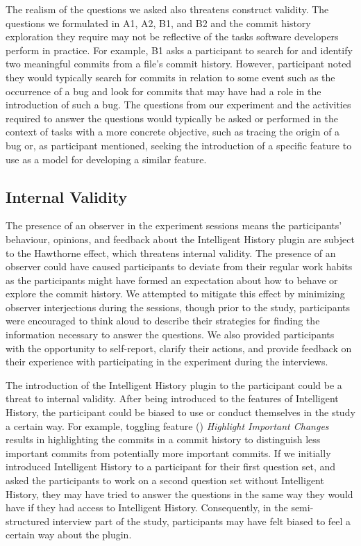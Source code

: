 The realism of the questions we asked also threatens construct validity.
The questions we formulated in A1, A2, B1, and B2 and the commit history exploration 
they require may not be reflective of the tasks software developers perform in practice.
For example, B1 asks a participant to search for and identify two meaningful commits from a 
file's commit history. However, participant  noted they would typically
search for commits in relation to some event such as the occurrence of a bug and look
for commits that may have had a role in the introduction of such a bug.
The questions from our experiment and the activities required to answer the questions would typically be
asked or performed in the context of tasks with a more concrete objective, 
such as tracing the origin of a bug or, as participant  mentioned, 
seeking the introduction of a specific feature to use as a model for developing a similar feature.

\subsection{Internal Validity}

The presence of an observer in the experiment sessions means the participants' behaviour, opinions, 
and feedback about the Intelligent History plugin are subject to the Hawthorne effect,
which threatens internal validity.
The presence of an observer could have caused participants to deviate from their regular work habits 
as the participants might have formed an expectation about how to behave or explore the commit history.
We attempted to mitigate this effect by minimizing observer interjections during the sessions, 
though prior to the study, participants were encouraged to think aloud to describe their strategies 
for finding the information necessary to answer the questions.
We also provided participants with the opportunity to self-report, clarify their actions, 
and provide feedback on their experience with participating in the experiment during the interviews.

The introduction of the Intelligent History plugin to the participant could be a threat to internal validity.
After being introduced to the features of Intelligent History, 
the participant could be biased to use or conduct themselves in the study a certain way.
For example, toggling feature () \textit{Highlight Important Changes} 
results in highlighting the commits in a commit history to distinguish less important commits from potentially more important commits.
If we initially introduced Intelligent History to a participant for their first question set,
and asked the participants to work on a second question set without Intelligent History,
they may have tried to answer the questions in the same way they would have if they had access to Intelligent History.
Consequently, in the semi-structured interview part of the study, 
participants may have felt biased to feel a certain way about the plugin.

